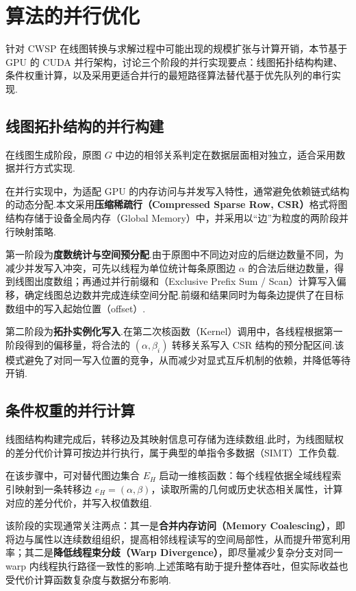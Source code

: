 \section{算法的并行优化}

针对 CWSP 在线图转换与求解过程中可能出现的规模扩张与计算开销，本节基于 GPU 的 CUDA 并行架构，讨论三个阶段的并行实现要点：线图拓扑结构构建、条件权重计算，以及采用更适合并行的最短路径算法替代基于优先队列的串行实现.

\subsection{线图拓扑结构的并行构建}

在线图生成阶段，原图 $G$ 中边的相邻关系判定在数据层面相对独立，适合采用数据并行方式实现.

在并行实现中，为适配 GPU 的内存访问与并发写入特性，通常避免依赖链式结构的动态分配.本文采用\textbf{压缩稀疏行（Compressed Sparse Row, CSR）}格式将图结构存储于设备全局内存（Global Memory）中，并采用以“边”为粒度的两阶段并行映射策略.

第一阶段为\textbf{度数统计与空间预分配}.由于原图中不同边对应的后继边数量不同，为减少并发写入冲突，可先以线程为单位统计每条原图边 $\alpha$ 的合法后继边数量，得到线图出度数组；再通过并行前缀和（Exclusive Prefix Sum / Scan）计算写入偏移，确定线图总边数并完成连续空间分配.前缀和结果同时为每条边提供了在目标数组中的写入起始位置（offset）.

第二阶段为\textbf{拓扑实例化写入}.在第二次核函数（Kernel）调用中，各线程根据第一阶段得到的偏移量，将合法的 $(\alpha, \beta_i)$ 转移关系写入 CSR 结构的预分配区间.该模式避免了对同一写入位置的竞争，从而减少对显式互斥机制的依赖，并降低等待开销.

\subsection{条件权重的并行计算}

线图结构构建完成后，转移边及其映射信息可存储为连续数组.此时，为线图赋权的差分代价计算可按边并行执行，属于典型的单指令多数据（SIMT）工作负载.

在该步骤中，可对替代图边集合 $E_H$ 启动一维核函数：每个线程依据全域线程索引映射到一条转移边 $e_H=(\alpha,\beta)$，读取所需的几何或历史状态相关属性，计算对应的差分代价，并写入权值数组.

该阶段的实现通常关注两点：其一是\textbf{合并内存访问（Memory Coalescing）}，即将边与属性以连续数组组织，提高相邻线程读写的空间局部性，从而提升带宽利用率；其二是\textbf{降低线程束分歧（Warp Divergence）}，即尽量减少复杂分支对同一 warp 内线程执行路径一致性的影响.上述策略有助于提升整体吞吐，但实际收益也受代价计算函数复杂度与数据分布影响.

